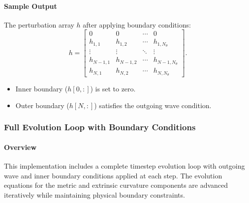 \documentclass[12pt]{article}
\begin{document}
\paragraph{Sample Output}
The perturbation array $h$ after applying boundary conditions:
\[
h =
\begin{bmatrix}
0 & 0 & \cdots & 0 \\
h_{1,1} & h_{1,2} & \cdots & h_{1,N_\theta} \\
\vdots & \vdots & \ddots & \vdots \\
h_{N-1,1} & h_{N-1,2} & \cdots & h_{N-1,N_\theta} \\
h_{N,1} & h_{N,2} & \cdots & h_{N,N_\theta}
\end{bmatrix}.
\]
\begin{itemize}
    \item Inner boundary ($h[0,:]$) is set to zero.
    \item Outer boundary ($h[N,:]$) satisfies the outgoing wave condition.
\end{itemize}

\subsubsection{Full Evolution Loop with Boundary Conditions}

\paragraph{Overview}
This implementation includes a complete timestep evolution loop with outgoing wave and inner boundary conditions applied at each step. The evolution equations for the metric and extrinsic curvature components are advanced iteratively while maintaining physical boundary constraints.
\end{document}
